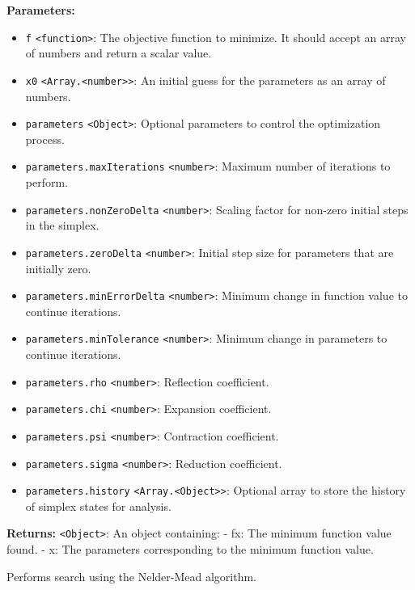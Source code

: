 \documentclass[12pt,a4paper]{article}
\begin{document}
\noindent \textbf{Parameters:}
\begin{itemize}
  \item \texttt{f} \texttt{<function>}: The objective function to minimize. It should accept an array of numbers and return a scalar value.
  \item \texttt{x0} \texttt{<Array.<number>>}: An initial guess for the parameters as an array of numbers.
  \item \texttt{parameters} \texttt{<Object>}: Optional parameters to control the optimization process.
  \item \texttt{parameters.maxIterations} \texttt{<number>}: Maximum number of iterations to perform.
  \item \texttt{parameters.nonZeroDelta} \texttt{<number>}: Scaling factor for non-zero initial steps in the simplex.
  \item \texttt{parameters.zeroDelta} \texttt{<number>}: Initial step size for parameters that are initially zero.
  \item \texttt{parameters.minErrorDelta} \texttt{<number>}: Minimum change in function value to continue iterations.
  \item \texttt{parameters.minTolerance} \texttt{<number>}: Minimum change in parameters to continue iterations.
  \item \texttt{parameters.rho} \texttt{<number>}: Reflection coefficient.
  \item \texttt{parameters.chi} \texttt{<number>}: Expansion coefficient.
  \item \texttt{parameters.psi} \texttt{<number>}: Contraction coefficient.
  \item \texttt{parameters.sigma} \texttt{<number>}: Reduction coefficient.
  \item \texttt{parameters.history} \texttt{<Array.<Object>>}: Optional array to store the history of simplex states for analysis.
\end{itemize}

\noindent \textbf{Returns:} \texttt{<Object>}: An object containing:
- \textasciigrave{}fx\textasciigrave{}: The minimum function value found.
- \textasciigrave{}x\textasciigrave{}: The parameters corresponding to the minimum function value.

\noindent Performs search using the Nelder-Mead algorithm.

\vspace{5mm}
\noindent {}
\end{document}
